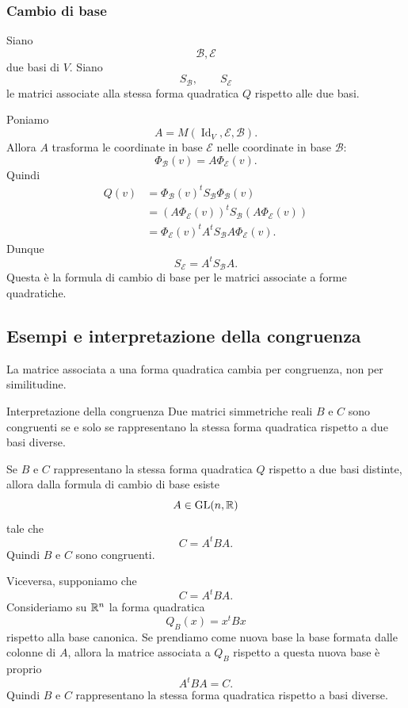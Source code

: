 \documentclass[a4paper]{article}
\begin{document}
\subsubsection{Cambio di base}

Siano
\[
    \mathcal{B},\mathcal{E}
\]
due basi di \(V\). Siano
\[
    S_{\mathcal{B}},
    \qquad
    S_{\mathcal{E}}
\]
le matrici associate alla stessa forma quadratica \(Q\) rispetto alle due basi.

Poniamo
\[
    A=M(\operatorname{Id}_V,\mathcal{E},\mathcal{B}).
\]
Allora \(A\) trasforma le coordinate in base \(\mathcal{E}\) nelle coordinate in base \(\mathcal{B}\):
\[
    \Phi_{\mathcal{B}}(v)=A\Phi_{\mathcal{E}}(v).
\]
Quindi
\begin{align*}
    Q(v)
    &=
    \Phi_{\mathcal{B}}(v)^tS_{\mathcal{B}}\Phi_{\mathcal{B}}(v)\\
    &=
    (A\Phi_{\mathcal{E}}(v))^t
    S_{\mathcal{B}}
    (A\Phi_{\mathcal{E}}(v))\\
    &=
    \Phi_{\mathcal{E}}(v)^t
    A^tS_{\mathcal{B}}A
    \Phi_{\mathcal{E}}(v).
\end{align*}
Dunque
\[
    S_{\mathcal{E}}=A^tS_{\mathcal{B}}A.
\]
Questa è la formula di cambio di base per le matrici associate a forme quadratiche.

\subsection{Esempi e interpretazione della congruenza}

La matrice associata a una forma quadratica cambia per congruenza, non per similitudine.

\begin{snippetproposition}{Interpretazione della congruenza}
    Due matrici simmetriche reali \(B\) e \(C\) sono congruenti se e solo se rappresentano la stessa forma quadratica rispetto a due basi diverse.
\end{snippetproposition}

\begin{snippetproof}{}
    Se \(B\) e \(C\) rappresentano la stessa forma quadratica \(Q\) rispetto a due basi distinte, allora dalla formula di cambio di base esiste
    \[
        A\in\operatorname{GL}(n,\mathbb{R})
    \]
    tale che
    \[
        C=A^tBA.
    \]
    Quindi \(B\) e \(C\) sono congruenti.

    Viceversa, supponiamo che
    \[
        C=A^tBA.
    \]
    Consideriamo su \(\mathbb{R}^n\) la forma quadratica
    \[
        Q_B(x)=x^tBx
    \]
    rispetto alla base canonica. Se prendiamo come nuova base la base formata dalle colonne di \(A\), allora la matrice associata a \(Q_B\) rispetto a questa nuova base è proprio
    \[
        A^tBA=C.
    \]
    Quindi \(B\) e \(C\) rappresentano la stessa forma quadratica rispetto a basi diverse.
\end{snippetproof}
\end{document}
